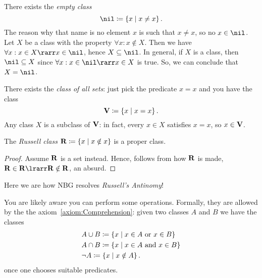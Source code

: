 \begin{construction}\label{construction:EmptyClass}
There exists the {\em empty class}
\[\nil \coloneq \set{x \mid x \ne x}.\]
The reason why that name is no element \(x\) is such that \(x \ne x\), so no \(x \in \nil\).\newline
Let \(X\) be a class with the property \(\forall x : x \notin X\). Then we have \(\forall x : x \in X \rarr x \in \nil\), hence \(X \subseteq \nil\). In general, if \(X\) is a class, then \(\nil \subseteq X\) since \(\forall x : x \in \nil \rarr x \in X\) is true. So, we can conclude that \(X = \nil\).
\end{construction}

\begin{construction}\label{construction:ClassOfAllSets}
There exists the {\em class of all sets}: just pick the predicate \(x = x\) and you have the class
\[\mathbf V \coloneq \left\{x \mid x = x\right\}.\]
Any class \(X\) is a subclass of \(\mathbf V\): in fact, every \(x \in X\) satisfies \(x = x\), so \(x \in \mathbf V\).
\end{construction}

\begin{theorem}\label{theorem:RussellClassIsProperClass}
The {\em Russell class} \(\mathbf R \coloneq \left\{x \mid x \notin x\right\}\) is a proper class.
\end{theorem}

\begin{proof}
Assume \(\mathbf R\) is a set instead. Hence, follows from how \(\mathbf R\) is made, \(\russell \in \russell \lrarr \russell \notin \russell\), an absurd.
\end{proof}

Here we are how NBG resolves {\em Russell's Antinomy}!

\begin{construction}
You are likely aware you can perform some operations. Formally, they are allowed by the the axiom~\ref{axiom:Comprehension}: given two classes \(A\) and \(B\) we have the classes
\begin{align*}
& A \cup B \coloneq \left\{x \mid x \in A \text{ or } x \in B\right\} \\
& A \cap B \coloneq \left\{x \mid x \in A \text{ and } x \in B\right\} \\
& \neg A \coloneq \left\{x \mid x \notin A\right\} .
\end{align*}
once one chooses suitable predicates. 
\end{construction}

